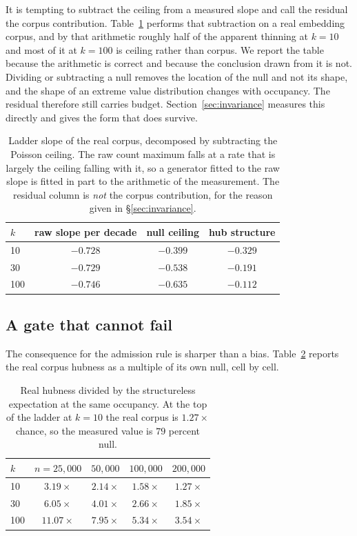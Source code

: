 \documentclass[11pt]{article}
\begin{document}
It is tempting to subtract the ceiling from a measured slope and call the
residual the corpus contribution. Table~\ref{tab:nulldecomp} performs that
subtraction on a real embedding corpus, and by that arithmetic roughly half
of the apparent thinning at $k = 10$ and most of it at $k = 100$ is ceiling
rather than corpus. We report the table because the arithmetic is correct and
because the conclusion drawn from it is not. Dividing or subtracting a null
removes the location of the null and not its shape, and the shape of an
extreme value distribution changes with occupancy. The residual therefore
still carries budget. Section~\ref{sec:invariance} measures this directly and
gives the form that does survive.

\begin{table}[t]
\centering
\small
\begin{tabular}{lccc}
\toprule
$k$ & raw slope per decade & null ceiling & hub structure \\
\midrule
10 & $-0.728$ & $-0.399$ & $\mathbf{-0.329}$ \\
30 & $-0.729$ & $-0.538$ & $\mathbf{-0.191}$ \\
100 & $-0.746$ & $-0.635$ & $\mathbf{-0.112}$ \\
\bottomrule
\end{tabular}
\caption{Ladder slope of the real corpus, decomposed by subtracting the
Poisson ceiling. The raw count maximum falls at a rate that is largely the
ceiling falling with it, so a generator fitted to the raw slope is fitted in
part to the arithmetic of the measurement. The residual column is
\emph{not} the corpus contribution, for the reason given in
\S\ref{sec:invariance}.}
\label{tab:nulldecomp}
\end{table}

\subsection{A gate that cannot fail}

The consequence for the admission rule is sharper than a bias.
Table~\ref{tab:excess} reports the real corpus hubness as a multiple of its
own null, cell by cell.

\begin{table}[t]
\centering
\small
\begin{tabular}{lcccc}
\toprule
$k$ & $n{=}25{,}000$ & $50{,}000$ & $100{,}000$ & $200{,}000$ \\
\midrule
10 & $3.19\times$ & $2.14\times$ & $1.58\times$ & $\mathbf{1.27\times}$ \\
30 & $6.05\times$ & $4.01\times$ & $2.66\times$ & $1.85\times$ \\
100 & $11.07\times$ & $7.95\times$ & $5.34\times$ & $3.54\times$ \\
\bottomrule
\end{tabular}
\caption{Real hubness divided by the structureless expectation at the same
occupancy. At the top of the ladder at $k = 10$ the real corpus is
$1.27\times$ chance, so the measured value is $79$ percent null.}
\label{tab:excess}
\end{table}
\end{document}
